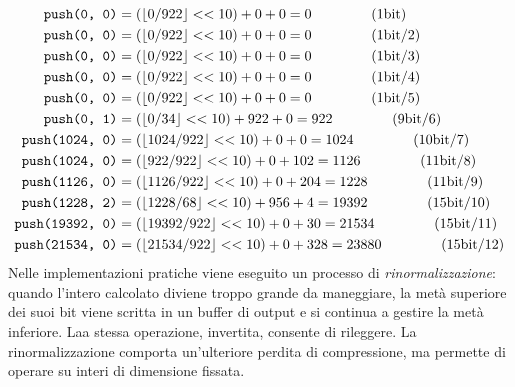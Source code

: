 \begin{align*}
    \texttt{push(0, 0)} &= (\left\lfloor 0 / 922 \right\rfloor << 10) + 0 + 0 = 0 \hspace{1.5cm} (1 \textnormal{bit})\\
    \texttt{push(0, 0)} &= (\left\lfloor 0 / 922 \right\rfloor << 10) + 0 + 0 = 0 \hspace{1.5cm} (1 \textnormal{bit} / 2)\\
    \texttt{push(0, 0)} &= (\left\lfloor 0 / 922 \right\rfloor << 10) + 0 + 0 = 0  \hspace{1.5cm} (1 \textnormal{bit} / 3)\\
    \texttt{push(0, 0)} &= (\left\lfloor 0 / 922 \right\rfloor << 10) + 0 + 0 = 0 \hspace{1.5cm} (1 \textnormal{bit} / 4)\\
    \texttt{push(0, 0)} &= (\left\lfloor 0 / 922 \right\rfloor << 10) + 0 + 0 = 0 \hspace{1.5cm} (1 \textnormal{bit} / 5) \\
    \texttt{push(0, 1)} &= (\left\lfloor 0 / 34 \right\rfloor << 10) + 922 + 0 = 922 \hspace{1.5cm} (9 \textnormal{bit} / 6) \\
    \texttt{push(1024, 0)} &= (\left\lfloor 1024 / 922 \right\rfloor << 10) + 0 + 0 = 1024 \hspace{1.5cm} (10 \textnormal{bit} / 7) \\
    \texttt{push(1024, 0)} &= (\left\lfloor 922 / 922 \right\rfloor << 10) + 0 + 102 = 1126 \hspace{1.5cm} (11 \textnormal{bit} / 8) \\
    \texttt{push(1126, 0)} &= (\left\lfloor 1126 / 922 \right\rfloor << 10) + 0 + 204 = 1228 \hspace{1.5cm} (11 \textnormal{bit} / 9) \\
    \texttt{push(1228, 2)} &= (\left\lfloor 1228 / 68 \right\rfloor << 10) + 956 + 4 = 19392 \hspace{1.5cm} (15 \textnormal{bit} / 10) \\
    \texttt{push(19392, 0)} &= (\left\lfloor 19392 / 922 \right\rfloor << 10) + 0 + 30 = 21534 \hspace{1.5cm} (15 \textnormal{bit} / 11) \\
    \texttt{push(21534, 0)} &= (\left\lfloor 21534 / 922 \right\rfloor << 10) + 0 + 328 = 23880 \hspace{1.5cm} (15 \textnormal{bit} / 12)
\end{align*}
Nelle implementazioni pratiche viene eseguito un processo di \textit{rinormalizzazione}: quando l'intero calcolato diviene troppo grande da maneggiare, la metà superiore dei suoi bit viene scritta in un buffer di output e si continua a gestire la metà inferiore. Laa stessa operazione, invertita, consente di rileggere. La rinormalizzazione comporta un'ulteriore perdita di compressione, ma permette di operare su interi di dimensione fissata.
